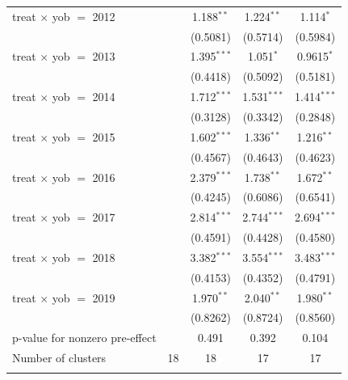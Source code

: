 \begin{table}[htbp]
\begin{tabular}{lcccc}
      treat $\times$ yob $=$ 2012    &               & 1.188$^{**}$  & 1.224$^{**}$  & 1.114$^{*}$\\   
                                     &               & (0.5081)      & (0.5714)      & (0.5984)\\   
      treat $\times$ yob $=$ 2013    &               & 1.395$^{***}$ & 1.051$^{*}$   & 0.9615$^{*}$\\   
                                     &               & (0.4418)      & (0.5092)      & (0.5181)\\   
      treat $\times$ yob $=$ 2014    &               & 1.712$^{***}$ & 1.531$^{***}$ & 1.414$^{***}$\\   
                                     &               & (0.3128)      & (0.3342)      & (0.2848)\\   
      treat $\times$ yob $=$ 2015    &               & 1.602$^{***}$ & 1.336$^{**}$  & 1.216$^{**}$\\   
                                     &               & (0.4567)      & (0.4643)      & (0.4623)\\   
      treat $\times$ yob $=$ 2016    &               & 2.379$^{***}$ & 1.738$^{**}$  & 1.672$^{**}$\\   
                                     &               & (0.4245)      & (0.6086)      & (0.6541)\\   
      treat $\times$ yob $=$ 2017    &               & 2.814$^{***}$ & 2.744$^{***}$ & 2.694$^{***}$\\   
                                     &               & (0.4591)      & (0.4428)      & (0.4580)\\   
      treat $\times$ yob $=$ 2018    &               & 3.382$^{***}$ & 3.554$^{***}$ & 3.483$^{***}$\\   
                                     &               & (0.4153)      & (0.4352)      & (0.4791)\\   
      treat $\times$ yob $=$ 2019    &               & 1.970$^{**}$  & 2.040$^{**}$  & 1.980$^{**}$\\   
                                     &               & (0.8262)      & (0.8724)      & (0.8560)\\   
      p-value for nonzero pre-effect &               & 0.491         & 0.392         & 0.104\\  
      Number of clusters             & 18            & 18            & 17            & 17\\  
       \\

\end{tabular}
\end{table}
